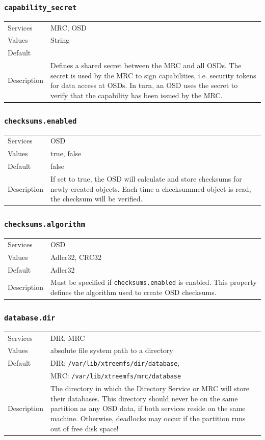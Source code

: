 \documentclass[a4paper,10pt]{book}
\begin{document}
\subsubsection{\texttt{capability\_secret}}
\begin{tabular}{lp{10cm}}
 Services & MRC, OSD\\
 Values   & String \\
 Default  & \\
 Description & Defines a shared secret between the MRC and all OSDs. The secret is used by the MRC to sign capabilities, i.e. security tokens for data access at OSDs. In turn, an OSD uses the secret to verify that the capability has been issued by the MRC.
\end{tabular}

\subsubsection{\texttt{checksums.enabled}}
\begin{tabular}{lp{10cm}}
 Services & OSD\\
 Values   & true, false \\
 Default  & false \\
 Description & If set to true, the OSD will calculate and store checksums for newly created objects. Each time a checksummed object is read, the checksum will be verified.
\end{tabular}

\subsubsection{\texttt{checksums.algorithm}}
\begin{tabular}{lp{10cm}}
 Services & OSD\\
 Values   & Adler32, CRC32 \\
 Default  & Adler32 \\
 Description & Must be specified if \texttt{checksums.enabled} is enabled. This property defines the algorithm used to create OSD checksums.
\end{tabular}

\subsubsection{\texttt{database.dir}}
\begin{tabular}{lp{10cm}}
 Services & DIR, MRC\\
 Values   & absolute file system path to a directory\\
 Default  & DIR: \texttt{/var/lib/xtreemfs/dir/database},\\
 & MRC: \texttt{/var/lib/xtreemfs/mrc/database}\\
 Description & The directory in which the Directory Service or MRC will store their databases. This directory should never be on the same partition as any OSD data, if both services reside on the same machine. Otherwise, deadlocks may occur if the partition runs out of free disk space!
\end{tabular}
\end{document}
